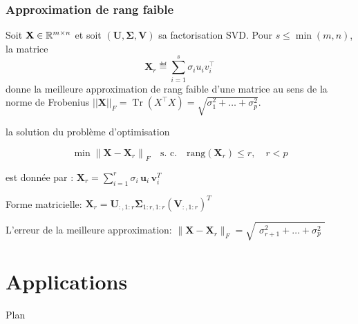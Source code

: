\documentclass[9pt]{beamer}
\newcommand{\norm}[1]{|\!| #1 |\!|}
\DeclareMathOperator{\Tr}{Tr}
\begin{document}
\begin{frame}
	
	\frametitle{Approximation de rang faible}
	
	
	
	
	Soit $\mathbf{X} \in \mathbb{R}^{m\times n}$ et soit $(\mathbf{U},\bm{\Sigma}, \mathbf{V})$ sa factorisation SVD. Pour $s \leq \min(m,n)$, la matrice
	$$
		\mathbf{X}_r \eqdef \sum_{i=1}^s \sigma_i u_i v_i^\top
	$$
	donne la meilleure approximation de rang faible d'une matrice au sens de la norme de Frobenius $\norm{ \mathbf{X} }_F = \Tr(X^\top X) = \sqrt{\sigma_1^2 +\dots +\sigma_p^2} .$
	 
	\begin{tcolorbox}	
	la solution du problème d'optimisation
	
	$$
	\min\left\lVert \mathbf{X} - \mathbf{X}_r \right\rVert_F \quad \text{s. c.} \quad \text{rang}( \mathbf{X}_r) \leq r, \quad r<p
	$$
	
	est donnée par : $
	\boxed{\mathbf{X}_r =  \sum_{i=1}^r \sigma_i \, \mathbf{u}_i \,  \mathbf{v}_i^T}$
	\end{tcolorbox}
	
	\vfill
	
	Forme matricielle: $\mathbf{X}_r = \mathbf{U}_{:,1:r} \bm{\Sigma}_{1:r,1:r} (\mathbf{V}_{:,1:r})^{T}$
	
	L'erreur de la meilleure approximation: $\lVert \mathbf{X} - \mathbf{X}_r \rVert_F = \sqrt{\begin{smallmatrix}\sigma_{r+1}^2 +\dots +\sigma_p^2\end{smallmatrix}}$
	
\end{frame}	





\section{Applications}
\begin{frame}{Plan}
\tableofcontents[currentsection]
\end{frame}
\end{document}

